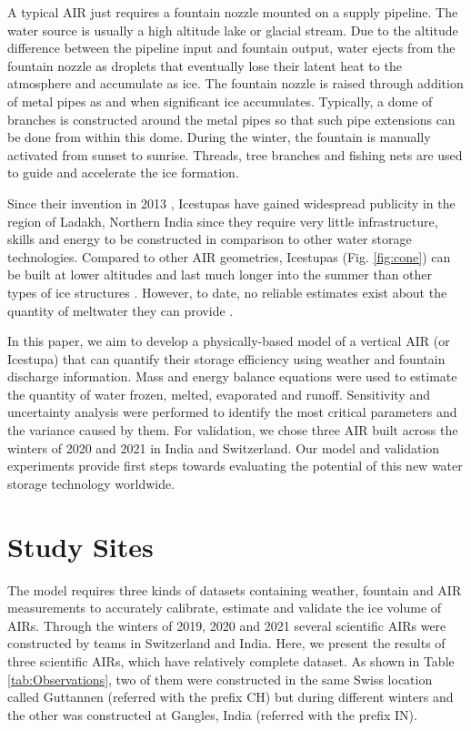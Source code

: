 \documentclass[utf8]{frontiersSCNS} %
\begin{document}
A typical AIR just requires a fountain nozzle mounted on a supply pipeline. The water source is usually a high altitude
lake or glacial stream. Due to the altitude difference between the pipeline input and fountain output, water ejects from
the fountain nozzle as droplets that eventually lose their latent heat to the atmosphere and accumulate as ice. The
fountain nozzle is raised through addition of metal pipes as and when significant ice accumulates.  Typically, a dome of
branches is constructed around the metal pipes so that such pipe extensions can be done from within this dome. During
the winter, the fountain is manually activated from sunset to sunrise. Threads, tree branches and fishing nets are used
to guide and accelerate the ice formation.

Since their invention in 2013 \citep{campaign}, Icestupas have gained widespread publicity in the region of Ladakh,
Northern India since they require very little infrastructure, skills and energy to be constructed in comparison to other
water storage technologies. Compared to other AIR geometries, Icestupas (Fig. \ref{fig:cone}) can be built at lower
altitudes and last much longer into the summer than other types of ice structures \citep{campaign}. However, to date, no
reliable estimates exist about the quantity of meltwater they can provide \citep{Nusser_2018}.

In this paper, we aim to develop a physically-based model of a vertical AIR (or Icestupa) that can quantify their
storage efficiency using weather and fountain discharge information. Mass and energy balance equations were used to
estimate the quantity of water frozen, melted, evaporated and runoff. Sensitivity and uncertainty analysis were
performed to identify the most critical parameters and the variance caused by them. For validation, we chose three AIR
built across the winters of 2020 and 2021 in India and Switzerland. Our model and validation experiments provide first
steps towards evaluating the potential of this new water storage technology worldwide.

\section{Study Sites}
The model requires three kinds of datasets containing weather, fountain and AIR measurements to accurately calibrate,
estimate and validate the ice volume of AIRs. Through the winters of 2019, 2020 and 2021 several scientific AIRs were
constructed by teams in Switzerland and India. Here, we present the results of three scientific AIRs, which have
relatively complete dataset. As shown in Table \ref{tab:Observations}, two of them were constructed in the same Swiss
location called Guttannen (referred with the prefix CH) but during different winters and the other was constructed at
Gangles, India (referred with the prefix IN).
\end{document}
